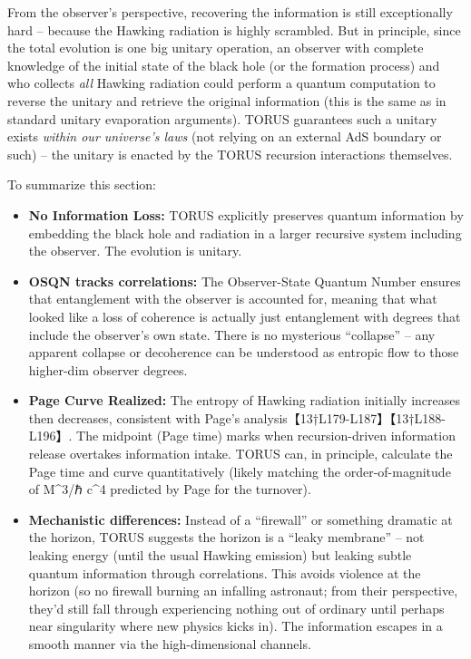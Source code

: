 \documentclass[]{article}
\begin{document}
From the observer's perspective, recovering the information is still
exceptionally hard -- because the Hawking radiation is highly scrambled.
But in principle, since the total evolution is one big unitary
operation, an observer with complete knowledge of the initial state of
the black hole (or the formation process) and who collects \emph{all}
Hawking radiation could perform a quantum computation to reverse the
unitary and retrieve the original information (this is the same as in
standard unitary evaporation arguments). TORUS guarantees such a unitary
exists \emph{within our universe's laws} (not relying on an external AdS
boundary or such) -- the unitary is enacted by the TORUS recursion
interactions themselves.

To summarize this section:

\begin{itemize}
\item
  \textbf{No Information Loss:} TORUS explicitly preserves quantum
  information by embedding the black hole and radiation in a larger
  recursive system including the observer. The evolution is unitary.
\item
  \textbf{OSQN tracks correlations:} The Observer-State Quantum Number
  ensures that entanglement with the observer is accounted for, meaning
  that what looked like a loss of coherence is actually just
  entanglement with degrees that include the observer's own state. There
  is no mysterious ``collapse'' -- any apparent collapse or decoherence
  can be understood as entropic flow to those higher-dim observer
  degrees.
\item
  \textbf{Page Curve Realized:} The entropy of Hawking radiation
  initially increases then decreases, consistent with Page's
  analysis【13†L179-L187】【13†L188-L196】. The midpoint (Page time)
  marks when recursion-driven information release overtakes information
  intake. TORUS can, in principle, calculate the Page time and curve
  quantitatively (likely matching the order-of-magnitude of M\^{}3/ℏ
  c\^{}4 predicted by Page for the turnover).
\item
  \textbf{Mechanistic differences:} Instead of a ``firewall'' or
  something dramatic at the horizon, TORUS suggests the horizon is a
  ``leaky membrane'' -- not leaking energy (until the usual Hawking
  emission) but leaking subtle quantum information through correlations.
  This avoids violence at the horizon (so no firewall burning an
  infalling astronaut; from their perspective, they'd still fall through
  experiencing nothing out of ordinary until perhaps near singularity
  where new physics kicks in). The information escapes in a smooth
  manner via the high-dimensional channels.
\end{itemize}
\end{document}

